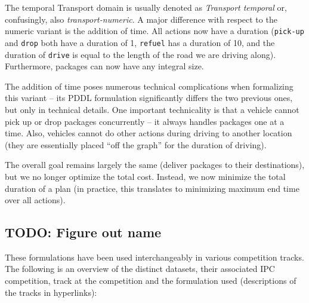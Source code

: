 The temporal Transport domain is usually denoted as \textit{Transport temporal} or, confusingly,
also \textit{transport-numeric}. A major difference with respect to the numeric variant is
the addition of time. All actions now have a duration (\verb+pick-up+ and \verb+drop+ both have a
duration of 1, \verb+refuel+ has a duration of 10, and the duration of \verb+drive+ is
equal to the length of the road we are driving along). Furthermore, packages can now have any integral size.

The addition of time poses numerous technical complications when formalizing this variant
-- its PDDL formulation significantly differs the two previous ones, but only in technical details.
One important technicality is that a vehicle cannot pick up or drop packages concurrently -- it always handles packages one at a time. Also, vehicles cannot do other actions during driving to another location (they are essentially placed ``off the graph'' for the duration of driving).

The overall goal remains largely the same (deliver packages to their destinations), but we no longer optimize the total cost. Instead, we now minimize the total duration of a plan (in practice, this translates to minimizing
maximum end time over all actions).

\subsection{TODO: Figure out name}

These formulations have been used interchangeably in various competition tracks.
The following is an overview of the distinct datasets, their associated IPC competition, track at the competition and the formulation used (descriptions of the tracks in hyperlinks):

